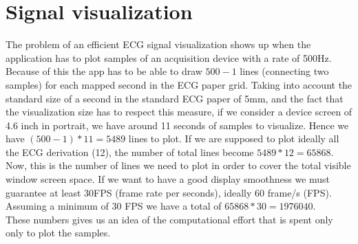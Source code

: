 \section{Signal visualization}
The problem of an efficient ECG signal visualization shows up when the application has to plot samples of an acquisition device with a rate of 500Hz. Because of this the app has to be able to draw $500-1$ lines (connecting two samples) for each mapped second in the ECG paper grid. Taking into account the standard size of a second in the standard ECG paper of 5mm, and the fact that the visualization size has to respect this measure, if we consider a device screen of 4.6 inch in portrait, we have around 11 seconds of samples to visualize. Hence we have $(500 - 1) * 11 = 5489$ lines to plot. If we are supposed to plot ideally all the ECG derivation (12), the number of total lines become $5489 * 12 = 65868$. Now, this is the number of lines  we need to plot in order to cover the total visible window screen space. If we want to have a good display smoothness we must guarantee at least 30FPS (frame rate per seconds), ideally 60 frame/s (FPS). Assuming a minimum of 30 FPS we have a total of $65868 * 30 = 1976040.$\\
These numbers gives us an idea of the computational effort that is spent only only to plot the samples.